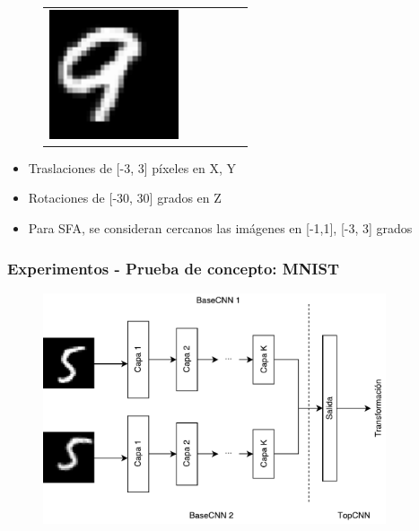 \documentclass{beamer}
\begin{document}
\begin{frame}
\begin{figure}
{\begin{tabular}{cccccc}
\includegraphics[width = 1.5in]{./images/mnist/c1.png}\\
\end{tabular}
}
\label{fig:mnist-sample}
\end{figure}
\vfill
\begin{itemize}
	\item Traslaciones de [-3, 3] píxeles en X, Y
	\item Rotaciones de [-30, 30] grados en Z
	\item Para SFA, se consideran cercanos las imágenes en [-1,1], [-3, 3] grados  
\end{itemize}

\end{frame}





\begin{frame}[plain]
\frametitle{Experimentos - Prueba de concepto: MNIST}
\begin{figure}
    \centering
    \includegraphics[width=0.9\textwidth]{images/siamese-example.pdf}
\end{figure}
\end{frame}
\end{document}
